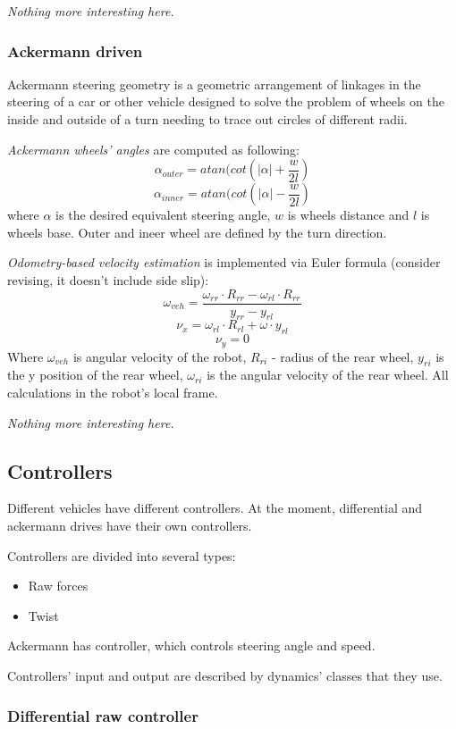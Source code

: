 \documentclass[a4paper,11pt]{article}
\begin{document}
\textit{Nothing more interesting here.}
\subsubsection{Ackermann driven}

Ackermann steering geometry is a geometric arrangement of linkages in the steering of a car or other vehicle designed to solve the problem of wheels on the inside and outside of a turn needing to trace out circles of different radii.

\textit{Ackermann wheels' angles }are computed as following:
\[
\alpha_{outer} = atan(cot(|\alpha| + \frac{w}{2l})
\]
\[
\alpha_{inner} = atan(cot(|\alpha| - \frac{w}{2l})
\]
where $\alpha$ is the desired equivalent steering angle, $w$ is wheels distance and $l$ is wheels base.
Outer and ineer wheel are defined by the turn direction.



\textit{Odometry-based velocity estimation} is implemented via Euler formula (consider revising, it doesn't include side slip):
\[
\omega_{veh} = \frac{\omega_{rr} \cdot R_{rr} - \omega_{rl} \cdot R_{rr}}{y_{rr} - y_{rl}}
\]
\[
\nu_x = \omega_{rl} \cdot R_{rl} + \omega \cdot y_{rl}
\]
\[
\nu_y = 0
\]
Where $\omega_{veh}$ is angular velocity of the robot, $R_{ri}$ - radius of the rear wheel, $y_{ri}$ is the y position of the rear wheel, $\omega_{ri}$ is the angular velocity of the rear wheel. All calculations in the robot's local frame. 


\textit{Nothing more interesting here.}


\subsection{Controllers}

Different vehicles have different controllers. 
At the moment, differential and ackermann drives have their own controllers. 

Controllers are divided into several types: 
\begin{itemize}
\item Raw forces
\item Twist
\end{itemize}

Ackermann has controller, which controls steering angle and speed. 

Controllers' input and output are described by dynamics' classes that they use. 

\subsubsection{Differential raw controller}
\end{document}
